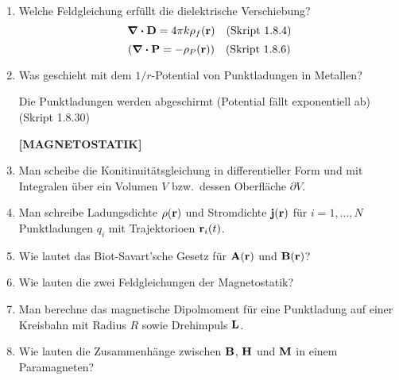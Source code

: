 \documentclass{scrartcl}
\begin{document}
\begin{enumerate}
    \item Welche Feldgleichung erfüllt die dielektrische Verschiebung?
          $$\div \vb D=4\pi k\rho_f(\vb r)\quad\text{(Skript 1.8.4)}$$
          $$\qty(\div \vb P=-\rho_P(\vb r))\quad\text{(Skript 1.8.6)}$$

    \item Was geschieht mit dem $1/r$-Potential von Punktladungen in
          Metallen?
          \begin{center}
            Die Punktladungen werden abgeschirmt (Potential fällt 
            exponentiell ab)
            (Skript 1.8.30)
          \end{center}

    \textbf{[MAGNETOSTATIK]}
    \item Man scheibe die Konitinuitätsgleichung in differentieller Form
          und mit Integralen über ein Volumen $V$ bzw.\ dessen Oberfläche 
          $\partial V$.

    \item Man schreibe Ladungsdichte $\rho(\vb r)$ und Stromdichte
          $\vb j(\vb r)$ für $i=1,\ldots,N$ Punktladungen $q_i$ mit 
          Trajektorioen $\vb r_i(t)$.

    \item Wie lautet das Biot-Savart'sche Gesetz für $\vb A(\vb r)$ und
          $\vb B(\vb r)$?

    \item Wie lauten die zwei Feldgleichungen der Magnetostatik?

    \item Man berechne das magnetische Dipolmoment für eine Punktladung auf
          einer Kreisbahn mit Radius $R$ sowie Drehimpuls $\vb L$.

    \item Wie lauten die Zusammenhänge zwischen $\vb B$, $\vb H$ 
          und $\vb M$ in einem Paramagneten?

  \end{enumerate}

  \newpage
\end{document}
